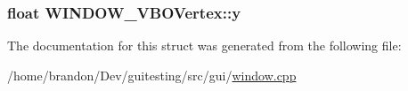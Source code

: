\hypertarget{struct_w_i_n_d_o_w___v_b_o_vertex_d41e4ccc3ebee1e50a9e6adf83c75e58}{
\subsubsection[{y}]{\setlength{\rightskip}{0pt plus 5cm}float {\bf WINDOW\_\-VBOVertex::y}}}
\label{struct_w_i_n_d_o_w___v_b_o_vertex_d41e4ccc3ebee1e50a9e6adf83c75e58}




The documentation for this struct was generated from the following file:\begin{CompactItemize}
\item 
/home/brandon/Dev/guitesting/src/gui/\hyperlink{window_8cpp}{window.cpp}\end{CompactItemize}
